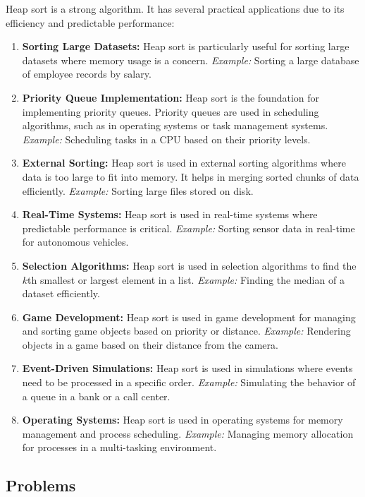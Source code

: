 Heap sort is a strong algorithm. It has several practical applications due to its efficiency and predictable performance:
\begin{enumerate}
    \item \textbf{Sorting Large Datasets:} Heap sort is particularly useful for sorting large datasets where memory usage is a concern. \textit{Example:} Sorting a large database of employee records by salary.
    \item \textbf{Priority Queue Implementation:} Heap sort is the foundation for implementing priority queues. Priority queues are used in scheduling algorithms, such as in operating systems or task management systems. \textit{Example:} Scheduling tasks in a CPU based on their priority levels.
    \item \textbf{External Sorting:} Heap sort is used in external sorting algorithms where data is too large to fit into memory. It helps in merging sorted chunks of data efficiently. \textit{Example:} Sorting large files stored on disk.
    \item \textbf{Real-Time Systems:} Heap sort is used in real-time systems where predictable performance is critical. \textit{Example:} Sorting sensor data in real-time for autonomous vehicles.
    \item \textbf{Selection Algorithms:} Heap sort is used in selection algorithms to find the $k$th smallest or largest element in a list. \textit{Example:} Finding the median of a dataset efficiently.
    \item \textbf{Game Development:} Heap sort is used in game development for managing and sorting game objects based on priority or distance. \textit{Example:} Rendering objects in a game based on their distance from the camera.
    \item \textbf{Event-Driven Simulations:} Heap sort is used in simulations where events need to be processed in a specific order. \textit{Example:} Simulating the behavior of a queue in a bank or a call center.
    \item \textbf{Operating Systems:} Heap sort is used in operating systems for memory management and process scheduling. \textit{Example:} Managing memory allocation for processes in a multi-tasking environment.
\end{enumerate}

\subsection{Problems}

